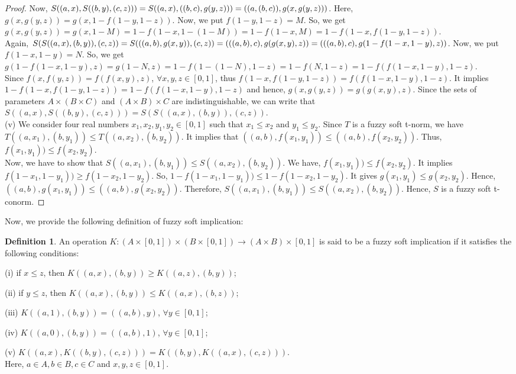 \documentclass{article}
\theoremstyle{definition}
\newtheorem{definition}{Definition}[section]
\begin{document}
\begin{proof}
    Now, $S((a, x), S((b, y), (c, z)))=S((a, x), ((b, c), g(y, z)))=((a, (b, c)), g(x,\\ g(y, z)))$. Here, $g(x, g(y, z))=g(x, 1-f(1-y, 1-z))$. Now, we put $f(1-y, 1-z)=M$. So, we get $g(x, g(y, z))=g(x, 1-M)=1-f(1-x, 1-(1-M))=1-f(1-x, M)=1-f(1-x, f(1-y, 1-z))$.\\

    Again, $S(S((a, x), (b, y)), (c, z))=S(((a, b), g(x, y)), (c, z))=(((a, b), c), g(g\\(x, y), z))=(((a, b), c), g(1-f(1-x, 1-y), z))$. Now, we put $f(1-x, 1-y)=N$. So, we get $g(1-f(1-x, 1-y), z)=g(1-N, z)=1-f(1-(1-N), 1-z)=1-f(N, 1-z)=1-f(f(1-x, 1-y), 1-z)$.\\

    Since $f(x, f(y, z))=f(f(x, y), z)$, $\forall x, y, z \in [0, 1]$, thus $f(1-x, f(1-y, 1-z))=f(f(1-x, 1-y), 1-z)$. It implies  $1-f(1-x, f(1-y, 1-z))=1-f(f(1-x, 1-y), 1-z)$ and hence, $g(x, g(y, z))=g(g(x, y), z)$. Since the sets of parameters $A\times(B\times C)$ and $(A\times B)\times C$ are indistinguishable, we can write that $S((a, x), S((b, y), (c, z))) = S(S((a, x), (b, y)), (c, z))$.\\

    (v) We consider four real numbers $x_1, x_2, y_1, y_2 \in [0, 1]$ such that $x_1 \leq x_2$ and $y_1 \leq y_2$. Since $T$ is a fuzzy soft t-norm, we have $T((a, x_1), (b, y_1)) \leq T((a, x_2), (b, y_2))$. It implies that $((a, b), f(x_1, y_1))\leq ((a, b), f(x_2, y_2))$. Thus, $f(x_1, y_1))\leq f(x_2, y_2)$.\\

    Now, we have to show that $S((a, x_1), (b, y_1)) \leq S((a, x_2), (b, y_2))$. We have, $f(x_1, y_1))\leq f(x_2, y_2)$. It implies $  f(1-x_1, 1-y_1))\geq f(1-x_2, 1-y_2)$. So, $ 1-f(1-x_1, 1-y_1))\leq 1-f(1-x_2, 1-y_2)$. It gives $  g(x_1, y_1) \leq g(x_2, y_2)$. Hence, $((a, b), g(x_1, y_1))\leq ((a, b), g(x_2, y_2))$. Therefore, $S((a, x_1), (b, y_1)) \leq S((a, x_2), (b, y_2))$.     Hence, $S$ is a fuzzy soft t-conorm.
    
\end{proof}

Now, we provide the following definition of fuzzy soft implication: 

\begin{definition}
    An operation $K:(A\times[0, 1])\times (B\times[0, 1]) \to (A\times B)\times[0, 1]$ is said to be a fuzzy soft implication if it satisfies the following conditions:

    (i) if $x\leq z$, then $K((a, x), (b, y))\geq K((a, z), (b, y))$;

    (ii) if $y\leq z$, then $K((a, x), (b, y))\leq K((a, x), (b, z))$;

    (iii) $K((a, 1), (b, y))=((a, b), y)$, $\forall y \in [0, 1]$;

    (iv) $K((a, 0), (b, y))=((a, b), 1)$, $\forall y \in [0, 1]$;

    (v) $K((a, x), K((b, y), (c, z)))=K((b, y), K((a, x), (c, z)))$.\\

    Here, $a\in A, b\in B, c\in C$ and $x, y, z \in [0, 1]$.
\end{definition}
\end{document}
